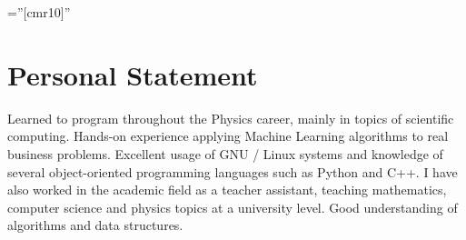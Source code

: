 \documentclass[a4paper,10pt]{article} %
\begin{document}
\pagestyle{empty} %
\BgThispage
\font\fb=''[cmr10]'' %

\small




\par{\bigskip\par} %
\par{\bigskip\par}
\par{\bigskip\par}

\section{Personal Statement}
\bigskip
Learned to program throughout the Physics career, mainly in topics of scientific computing. Hands-on experience applying Machine Learning algorithms to real business problems. Excellent usage of GNU / Linux systems and knowledge of several object-oriented programming languages such as Python and C++. I have also worked in the academic field as a teacher assistant, teaching mathematics, computer science and physics topics at a university level. Good understanding of algorithms and data structures.
\end{document}
